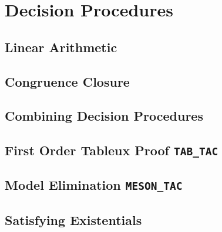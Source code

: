 \chapter{Decision Procedures}

\section{Linear Arithmetic}

\section{Congruence Closure}

\section{Combining Decision Procedures}

\section{First Order Tableux Proof {\tt TAB\_TAC}}

\section{Model Elimination {\tt MESON\_TAC}}

\section{Satisfying Existentials}

\label{solving-existentials}

